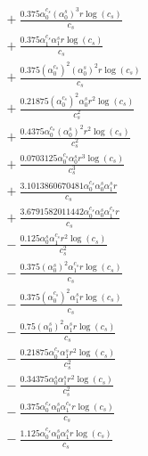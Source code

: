 \documentclass[10pt]{article}
\begin{document}
\begin{align*}
&{}  + \frac{0.375 \alpha_{0}^{c_s} \left(\alpha_{0}^s\right)^{3} r \log{\left(c_{s} \right)}}{c_{s}} \\
&{}  + \frac{0.375 \alpha_{1}^{c_s} \alpha_{1}^s r \log{\left(c_{s} \right)}}{c_{s}} \\
&{}  + \frac{0.375 \left(\alpha_{0}^{c_s}\right)^{2} \left(\alpha_{0}^s\right)^{2} r \log{\left(c_{s} \right)}}{c_{s}} \\
&{}  + \frac{0.21875 \left(\alpha_{0}^{c_s}\right)^{2} \alpha_{0}^s r^{2} \log{\left(c_{s} \right)}}{c_{s}^{2}} \\
&{}  + \frac{0.4375 \alpha_{0}^{c_s} \left(\alpha_{0}^s\right)^{2} r^{2} \log{\left(c_{s} \right)}}{c_{s}^{2}} \\
&{}  + \frac{0.0703125 \alpha_{0}^{c_s} \alpha_{0}^s r^{3} \log{\left(c_{s} \right)}}{c_{s}^{3}} \\
&{}  + \frac{3.1013860670481 \alpha_{0}^{c_s} \alpha_{0}^s \alpha_{1}^s r}{c_{s}} \\
&{}  + \frac{3.6791582011442 \alpha_{0}^{c_s} \alpha_{0}^s \alpha_{1}^{c_s} r}{c_{s}} \\
&{}  - \frac{0.125 \alpha_{0}^s \alpha_{1}^{c_s} r^{2} \log{\left(c_{s} \right)}}{c_{s}^{2}} \\
&{}  - \frac{0.375 \left(\alpha_{0}^s\right)^{2} \alpha_{1}^{c_s} r \log{\left(c_{s} \right)}}{c_{s}} \\
&{}  - \frac{0.375 \left(\alpha_{0}^{c_s}\right)^{2} \alpha_{1}^s r \log{\left(c_{s} \right)}}{c_{s}} \\
&{}  - \frac{0.75 \left(\alpha_{0}^s\right)^{2} \alpha_{1}^s r \log{\left(c_{s} \right)}}{c_{s}} \\
&{}  - \frac{0.21875 \alpha_{0}^{c_s} \alpha_{1}^s r^{2} \log{\left(c_{s} \right)}}{c_{s}^{2}} \\
&{}  - \frac{0.34375 \alpha_{0}^s \alpha_{1}^s r^{2} \log{\left(c_{s} \right)}}{c_{s}^{2}} \\
&{}  - \frac{0.375 \alpha_{0}^{c_s} \alpha_{0}^s \alpha_{1}^{c_s} r \log{\left(c_{s} \right)}}{c_{s}} \\
&{}  - \frac{1.125 \alpha_{0}^{c_s} \alpha_{0}^s \alpha_{1}^s r \log{\left(c_{s} \right)}}{c_{s}}
\end{align*}
\end{document}
